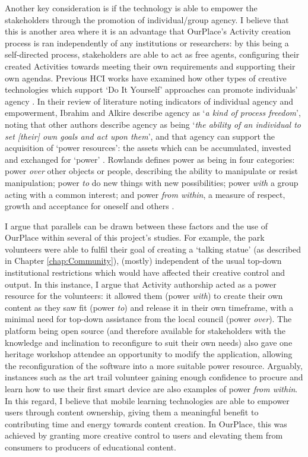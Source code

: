 Another key consideration is if the technology is able to empower the stakeholders through the promotion of individual/group agency. I believe that this is another area where it is an advantage that OurPlace's Activity creation process is ran independently of any institutions or researchers: by this being a self-directed process, stakeholders are able to act as free agents, configuring their created Activities towards meeting their own requirements and supporting their own agendas. Previous HCI works have examined how other types of creative technologies which support `Do It Yourself' approaches can promote individuals' agency \citep{Chatting2017, Meissner2017}. In their review of literature noting indicators of individual agency and empowerment, Ibrahim and Alkire describe agency as `\textit{a kind of process freedom}', noting that other authors describe agency as being `\textit{the ability of an individual to set [their] own goals and act upon them}', and that agency can support the acquisition of `power resources': the assets which can be accumulated, invested and exchanged for `power' \citep{Ibrahim2007}. Rowlands defines power as being in four categories: power \textit{over} other objects or people, describing the ability to manipulate or resist manipulation; power \textit{to} do new things with new possibilities; power \textit{with} a group acting with a common interest; and power \textit{from within}, a measure of respect, growth and acceptance for oneself and others \citep{Rowlands1997}. 

I argue that parallels can be drawn between these factors and the use of OurPlace within several of this project's studies. For example, the park volunteers were able to fulfil their goal of creating a `talking statue' (as described in Chapter \ref{chap:Community}), (mostly) independent of the usual top-down institutional restrictions which would have affected their creative control and output. In this instance, I argue that Activity authorship acted as a power resource for the volunteers: it allowed them (power \textit{with}) to create their own content as they saw fit (power \textit{to}) and release it in their own timeframe, with a minimal need for top-down assistance from the local council (power \textit{over}). The platform being open source (and therefore available for stakeholders with the knowledge and inclination to reconfigure to suit their own needs) also gave one heritage workshop attendee an opportunity to modify the application, allowing the reconfiguration of the software into a more suitable power resource. Arguably, instances such as the art trail volunteer gaining enough confidence to procure and learn how to use their first smart device are also examples of power \textit{from within}. In this regard, I believe that mobile learning technologies are able to empower users through content ownership, giving them a meaningful benefit to contributing time and energy towards content creation. In OurPlace, this was achieved by granting more creative control to users and elevating them from consumers to producers of educational content.

